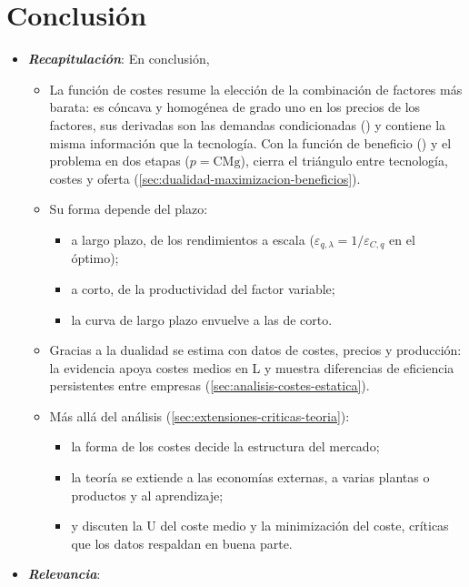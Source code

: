 \documentclass[11pt]{article}
\begin{document}
\section*{Conclusión}

\begin{itemize}
\item \textbf{\emph{Recapitulación}}: En conclusión,
  \begin{itemize}
  \item La función de costes resume la elección de la combinación de factores más barata: es cóncava y homogénea de grado uno en los precios de los factores, sus derivadas son las demandas condicionadas () y contiene la misma información que la tecnología. Con la función de beneficio () y el problema en dos etapas ($p=\mathrm{CMg}$), cierra el triángulo entre tecnología, costes y oferta (\ref{sec:dualidad-maximizacion-beneficios}).
  \item Su forma depende del plazo:
    \begin{itemize}
    \item a largo plazo, de los rendimientos a escala ($\varepsilon_{q,\lambda}=1/\varepsilon_{C,q}$ en el óptimo);
    \item a corto, de la productividad del factor variable;
    \item la curva de largo plazo envuelve a las de corto.
    \end{itemize}
  \item Gracias a la dualidad se estima con datos de costes, precios y producción: la evidencia apoya costes medios en L y muestra diferencias de eficiencia persistentes entre empresas (\ref{sec:analisis-costes-estatica}).
  \item Más allá del análisis (\ref{sec:extensiones-criticas-teoria}):
    \begin{itemize}
    \item la forma de los costes decide la estructura del mercado;
    \item la teoría se extiende a las economías externas, a varias plantas o productos y al aprendizaje;
    \item {} y  discuten la U del coste medio y la minimización del coste, críticas que los datos respaldan en buena parte.
    \end{itemize}
  \end{itemize}
\item \textbf{\emph{Relevancia}}:

\end{itemize}
\end{document}
